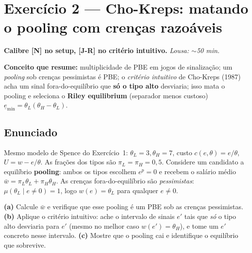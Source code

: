 \documentclass[11pt,a4paper]{article}
\newcommand{\calY}{\textbf{\textcolor{amarelo}{[N]}}} %
\newcommand{\calR}{\textbf{\textcolor{verm}{[J-R]}}}  %
\newcommand{\dc}[2]{#1{,}#2}
\newif\ifsolucao
\begin{document}
\hrulefill

\section*{\textcolor{insper}{Exercício 2 — Cho-Kreps: matando o pooling com crenças razoáveis}}
\noindent\textbf{Calibre \calY{} no setup, \calR{} no critério intuitivo.} \quad \emph{Lousa: $\sim$50 min.}
\par\smallskip
\noindent\textbf{Conceito que resume:} multiplicidade de PBE em jogos de sinalização; um
\emph{pooling} sob crenças pessimistas é PBE; o \emph{critério intuitivo} de Cho-Kreps (1987)
acha um sinal fora-do-equilíbrio que \textbf{só o tipo alto} desviaria; isso mata o pooling e
seleciona o \textbf{Riley equilibrium} (separador menos custoso)
$\underline e_{\min}=\theta_L(\theta_H-\theta_L)$.

\subsection*{Enunciado}
Mesmo modelo de Spence do Exercício~1: $\theta_L=3,\theta_H=7$, custo $c(e,\theta)=e/\theta$,
$U=w-e/\theta$. As frações dos tipos são $\pi_L=\pi_H=\dc{0}{5}$. Considere um candidato a
equilíbrio \textbf{pooling}: ambos os tipos escolhem $e^p=0$ e recebem o salário médio
$\bar w=\pi_L\theta_L+\pi_H\theta_H$. As crenças fora-do-equilíbrio são \emph{pessimistas}:
$\mu(\theta_L\mid e\ne 0)=1$, logo $w(e)=\theta_L$ para qualquer $e\ne 0$.

\smallskip
\noindent\textbf{(a)} Calcule $\bar w$ e verifique que esse pooling é um PBE sob as crenças
pessimistas. \textbf{(b)} Aplique o critério intuitivo: ache o intervalo de sinais $e'$ tais
que \emph{só} o tipo alto desviaria para $e'$ (mesmo no melhor caso $w(e')=\theta_H$), e tome
um $e'$ concreto nesse intervalo. \textbf{(c)} Mostre que o pooling cai e identifique o
equilíbrio que sobrevive.

\ifsolucao
\end{document}
